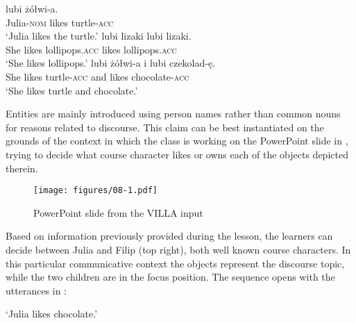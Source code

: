 \ea%
    \label{ex:08:1}
    \ea
    \label{ex:08:1a}
     {lubi} {żółwi-a.}\\
            Julia-\textsc{nom}  likes  turtle-\textsc{acc}\\
    \glt    ‘Julia likes the turtle.’
    \ex
    \label{ex:08:1b}
       {lubi}   {lizaki}     {lubi}   {lizaki.}\\
            She  likes  lollipops\textsc{.acc}   likes  lollipops\textsc{.acc}\\
    \glt    ‘She likes lollipops.’
    \ex
    \label{ex:08:1c}
       {lubi}   {żółwi-a}   {i}   {lubi}   {czekolad-ę.}\\
            She  likes  turtle-\textsc{acc}  and  likes  chocolate-\textsc{acc}\\
    \glt    ‘She likes turtle and chocolate.’
    \z
\z

Entities are mainly introduced using person names rather than common nouns for reasons related to discourse. This claim can be best instantiated on the grounds of the context in which the class is working on the PowerPoint slide in , trying to decide what course character likes or owns each of the objects depicted therein.

\begin{figure}
    \texttt{[image: figures/08-1.pdf]}
    \caption{PowerPoint slide from the VILLA input}
    \label{fig:08:1}
\end{figure}

Based on information previously provided during the lesson, the learners can decide between Julia and Filip (top right), both well known course characters. In this particular communicative context the objects represent the discourse topic, while the two children are in the focus position. The sequence opens with the utterances in :

\ea%
    \label{ex:08:2}
    \glt    ‘Julia likes chocolate.’
    \z
\z

